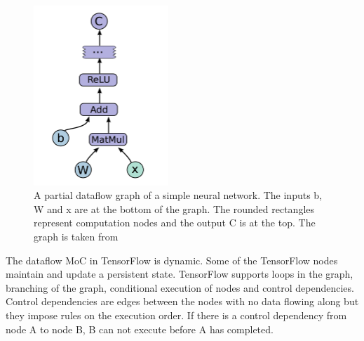 \documentclass[conference,a4paper]{IEEEtran}
\begin{document}
\begin{figure}[!t]
    \centering
    \includegraphics[width=12pc]{tf_simple_neural.png}
        \caption{A partial dataflow graph of a simple neural network. The inputs
        b, W and x are at the bottom of the graph. The rounded rectangles
        represent computation nodes and the output C is at the top. The graph is
        taken from \cite{tensorflow2015-whitepaper}}
        \label{fig:simple_tf}
\end{figure}

The dataflow MoC in TensorFlow is dynamic. Some of the TensorFlow nodes maintain
and update a persistent state. TensorFlow supports loops in the graph, branching
of the graph, conditional execution of nodes and control dependencies. Control
dependencies are edges between the nodes with no data flowing along but they
impose rules on the execution order. If there is a control dependency from node
A to node B, B can not execute before A has completed.
\cite{tensorflow2015-whitepaper}
\end{document}
